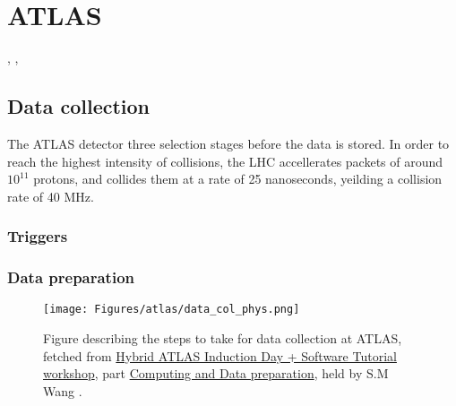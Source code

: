 \section{ATLAS}

, \cite{collaboration_2020}, \cite{Owen:2302730} 






\subsection*{Data collection}
The ATLAS detector three selection stages before the data is stored. In order to reach the highest intensity of collisions, the LHC accellerates
packets of around $10^{11}$ protons, and collides them at a rate of 25 nanoseconds, yeilding a collision rate of 40 MHz\cite{Wang:2707056}. \cite{Bernius:2707054}

\subsubsection*{Triggers}


\subsubsection*{Data preparation}

\begin{figure}
    \texttt{[image: Figures/atlas/data\_col\_phys.png]}
    \caption{Figure describing the steps to take for data collection at ATLAS, fetched from \href{https://indico.cern.ch/event/1159574/timetable/?view=standard}{Hybrid ATLAS Induction Day + Software Tutorial workshop}, part
    \href{https://indico.cern.ch/event/860971/contributions/3672974/attachments/1972049/3280896/Atlas_computing_data_preparation_jan20.pdf}{Computing and Data preparation}, 
    held by S.M Wang \cite{Wang:2707056} . }
    \label{fig:atlas_data_col_phys}
\end{figure}

